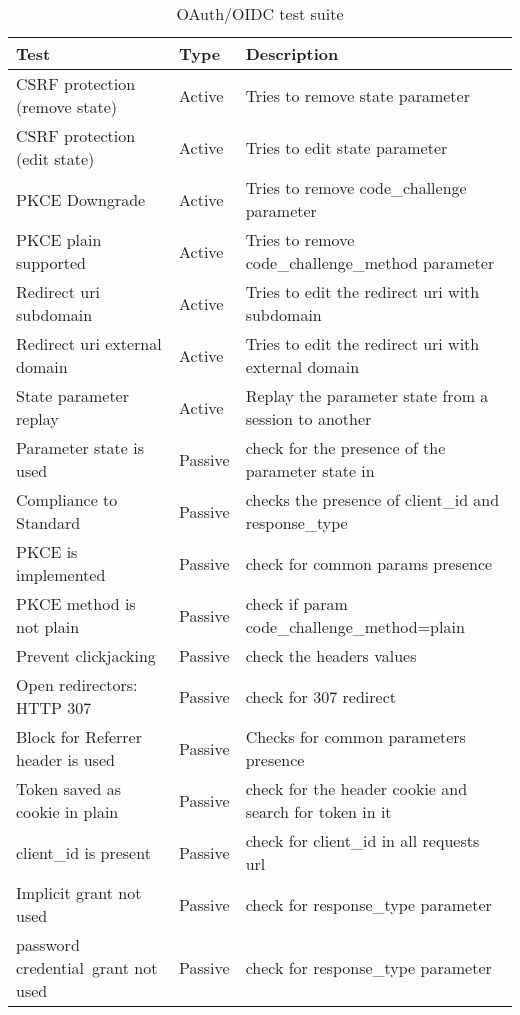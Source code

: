 \begin{table}[h]
    \begin{tabular}{|l|l|l|}
        \hline
        Test                                   & Type         & Description                             \\
        \hline\hline
        CSRF protection (remove state)          & Active        & Tries to remove state parameter \\
        CSRF protection (edit state)    &   Active  &   Tries to edit state parameter\\
        PKCE Downgrade                  &   Active  &   Tries to remove code\_challenge parameter \\
        PKCE plain supported            &   Active  &   Tries to remove code\_challenge\_method parameter \\
        Redirect uri subdomain          &   Active  &   Tries to edit the redirect uri with subdomain \\
        Redirect uri external domain    &   Active  &   Tries to edit the redirect uri with external domain \\
        State parameter replay          &   Active  &   Replay the parameter state from a session to another \\
        Parameter state is used         &   Passive  &   check for the presence of the parameter state in \\
        Compliance to Standard          &   Passive  &   checks the presence of client\_id and response\_type\\
        PKCE is implemented             &   Passive &   check for common params presence \\
        PKCE method is not plain        &   Passive &   check if param code\_challenge\_method=plain \\
        Prevent clickjacking            &   Passive &   check the headers values \\
        Open redirectors: HTTP 307      &   Passive &   check for 307 redirect \\
        Block for Referrer header is used  &    Passive &   Checks for common parameters presence \\
        Token saved as cookie in plain  &   Passive &   check for the header cookie and search for token in it\\
        client\_id is present            &   Passive &   check for client\_id in all requests url \\
        Implicit grant not used         &   Passive &   check for response\_type parameter \\ 
        password credential\ grant not used  &   Passive &   check for response\_type parameter \\
        \hline
    \end{tabular}
    \caption{\label{tab:OAuth_test_suite}OAuth/OIDC test suite}
\end{table}

